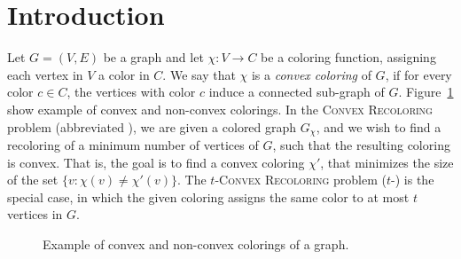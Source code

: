 
\section{Introduction}

Let $G = (V, E)$ be a graph and let $\chi : V \rightarrow C$ be a
coloring function, assigning each vertex in $V$ a color in $C$.  We
say that $\chi$ is a \emph{convex coloring} of $G$, if for every color
$c \in C$, the vertices with color $c$ induce a connected sub-graph of
$G$. Figure~\ref{fig:convex} show example of convex and non-convex colorings.
%
In the \textsc{Convex Recoloring} problem (abbreviated \CRP{}), 
we are given a colored graph $G_\chi$,
and we wish to find a recoloring of a minimum number of vertices of $G$,
such that the resulting coloring is convex. 
That is,
the goal is to find a convex coloring $\chi'$,
that minimizes the size of the set $\{v : \chi(v) \neq \chi'(v)\}$.
%
The \textsc{$t$-Convex Recoloring} problem ($t$-\CRP{}) is the special
case, in which the given coloring assigns the same color to at most
$t$ vertices in $G$.


\begin{figure}
\centering

\caption{Example of convex and non-convex colorings of a graph.}
\label{fig:convex}
\end{figure}




